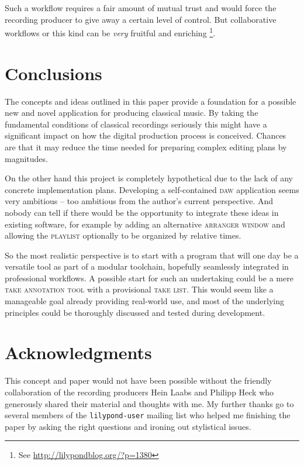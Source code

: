 \documentclass[11pt,a4paper]{article}
\newcommand*{\term}[1]{\textsc{#1}}
\begin{document}
Such a workflow requires a fair amount of mutual trust and would force the
recording producer to give away a certain level of control.
But collaborative workflows or this kind can be \emph{very} fruitful and
enriching%
\footnote{See \url{http://lilypondblog.org/?p=1380}}.


\section{Conclusions}

The concepts and ideas outlined in this paper provide a foundation for a
possible new and novel application for producing classical music. By taking
the fundamental conditions of classical recordings seriously this might have
a significant impact on how the digital production process is conceived.
Chances are that it may reduce the time needed for preparing complex editing
plans by magnitudes.

On the other hand this project is completely hypothetical due to the lack of
any concrete implementation plans. Developing a self-contained \textsc{daw}
application seems very ambitious -- too ambitious from the author's current
perspective. And nobody can tell if there would be the opportunity to 
integrate these ideas in existing software, for example by adding an alternative
\term{arranger window} and allowing the \term{playlist} optionally to be
organized by relative times.

So the most realistic perspective is to start with a program that will one day
be a versatile tool as part of a modular toolchain, hopefully seamlessly
integrated in professional workflows. A possible start for such an undertaking
could be a mere \term{take annotation tool} with a provisional \term{take list}.
This would seem like a manageable goal already providing real-world use, and
most of the underlying principles could be thoroughly discussed and tested
during development. 

\section{Acknowledgments}

This concept and paper would not have been possible without the friendly collaboration
of the recording producers Hein Laabs and Philipp Heck who generously shared their
material and thoughts with me. My further thanks go to several members of the
\texttt{lilypond-user} mailing list who helped me finishing the paper by asking
the right questions and ironing out stylistical issues. 
\end{document}
